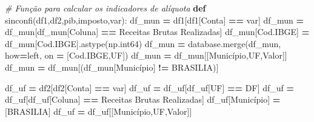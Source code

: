 \documentclass[
  12,
  dvipsnames]{article}
\newenvironment{Shaded}{\begin{snugshade}}{\end{snugshade}}
\newcommand{\CommentTok}[1]{\textcolor[rgb]{0.56,0.35,0.01}{\textit{#1}}}
\newcommand{\KeywordTok}[1]{\textcolor[rgb]{0.13,0.29,0.53}{\textbf{#1}}}
\newcommand{\NormalTok}[1]{#1}
\newcommand{\OperatorTok}[1]{\textcolor[rgb]{0.81,0.36,0.00}{\textbf{#1}}}
\newcommand{\StringTok}[1]{\textcolor[rgb]{0.31,0.60,0.02}{#1}}
\begin{document}
\begin{Shaded}
\begin{Highlighting}[]
\CommentTok{\# Função para calcular os indicadores de alíquota}
\KeywordTok{def}\NormalTok{ sinconfi(df1,df2,pib,imposto,var):}
\NormalTok{    df\_mun }\OperatorTok{=}\NormalTok{ df1[df1[}\StringTok{\textquotesingle{}Conta\textquotesingle{}}\NormalTok{] }\OperatorTok{==}\NormalTok{ var]}
\NormalTok{    df\_mun }\OperatorTok{=}\NormalTok{ df\_mun[df\_mun[}\StringTok{\textquotesingle{}Coluna\textquotesingle{}}\NormalTok{] }\OperatorTok{==} \StringTok{\textquotesingle{}Receitas Brutas Realizadas\textquotesingle{}}\NormalTok{]}
\NormalTok{    df\_mun[}\StringTok{\textquotesingle{}Cod.IBGE\textquotesingle{}}\NormalTok{] }\OperatorTok{=}\NormalTok{ df\_mun[}\StringTok{\textquotesingle{}Cod.IBGE\textquotesingle{}}\NormalTok{].astype(np.int64)}
\NormalTok{    df\_mun }\OperatorTok{=}\NormalTok{ database.merge(df\_mun, how}\OperatorTok{=}\StringTok{\textquotesingle{}left\textquotesingle{}}\NormalTok{, on }\OperatorTok{=}\NormalTok{ [}\StringTok{\textquotesingle{}Cod.IBGE\textquotesingle{}}\NormalTok{,}\StringTok{\textquotesingle{}UF\textquotesingle{}}\NormalTok{])}
\NormalTok{    df\_mun }\OperatorTok{=}\NormalTok{ df\_mun[[}\StringTok{\textquotesingle{}Município\textquotesingle{}}\NormalTok{,}\StringTok{\textquotesingle{}UF\textquotesingle{}}\NormalTok{,}\StringTok{\textquotesingle{}Valor\textquotesingle{}}\NormalTok{]]}
\NormalTok{    df\_mun }\OperatorTok{=}\NormalTok{ df\_mun[(df\_mun[}\StringTok{\textquotesingle{}Município\textquotesingle{}}\NormalTok{] }\OperatorTok{!=} \StringTok{\textquotesingle{}BRASILIA\textquotesingle{}}\NormalTok{)]}
    
\NormalTok{    df\_uf }\OperatorTok{=}\NormalTok{ df2[df2[}\StringTok{\textquotesingle{}Conta\textquotesingle{}}\NormalTok{] }\OperatorTok{==}\NormalTok{ var]}
\NormalTok{    df\_uf }\OperatorTok{=}\NormalTok{ df\_uf[df\_uf[}\StringTok{\textquotesingle{}UF\textquotesingle{}}\NormalTok{] }\OperatorTok{==} \StringTok{\textquotesingle{}DF\textquotesingle{}}\NormalTok{]}
\NormalTok{    df\_uf }\OperatorTok{=}\NormalTok{ df\_uf[df\_uf[}\StringTok{\textquotesingle{}Coluna\textquotesingle{}}\NormalTok{] }\OperatorTok{==} \StringTok{\textquotesingle{}Receitas Brutas Realizadas\textquotesingle{}}\NormalTok{]}
\NormalTok{    df\_uf[}\StringTok{\textquotesingle{}Município\textquotesingle{}}\NormalTok{] }\OperatorTok{=}\NormalTok{ [}\StringTok{\textquotesingle{}BRASILIA\textquotesingle{}}\NormalTok{]}
\NormalTok{    df\_uf }\OperatorTok{=}\NormalTok{ df\_uf[[}\StringTok{\textquotesingle{}Município\textquotesingle{}}\NormalTok{,}\StringTok{\textquotesingle{}UF\textquotesingle{}}\NormalTok{,}\StringTok{\textquotesingle{}Valor\textquotesingle{}}\NormalTok{]]}
    

\end{Highlighting}
\end{Shaded}
\end{document}
